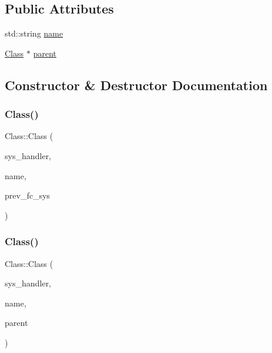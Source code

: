 \subsection*{Public Attributes}
\begin{DoxyCompactItemize}
\item 
std\+::string \hyperlink{classClass_aac209ee2e03afc3bc9e93fd1fd46256b}{name}
\item 
\hyperlink{classClass}{Class} $\ast$ \hyperlink{classClass_a1f94bc39c04d18b5c4421862f8506d1d}{parent}
\end{DoxyCompactItemize}


\subsection{Constructor \& Destructor Documentation}
\mbox{\label{classClass_a1c88be1af88c4c9b3c054d124ce44b6e}} 
\subsubsection{\texorpdfstring{Class()}{Class()}\hspace{0.1cm}{\footnotesize\ttfamily [1/2]}}
{\footnotesize\ttfamily Class\+::\+Class (\begin{DoxyParamCaption}\item[{\hyperlink{classSystemHandler}{System\+Handler} $\ast$}]{sys\+\_\+handler,  }\item[{std\+::string}]{name,  }\item[{\hyperlink{classFunctionSystem}{Function\+System} $\ast$}]{prev\+\_\+fc\+\_\+sys }\end{DoxyParamCaption})}

\mbox{\label{classClass_a1b960c202d43c46097e267e5c4e259ef}} 
\subsubsection{\texorpdfstring{Class()}{Class()}\hspace{0.1cm}{\footnotesize\ttfamily [2/2]}}
{\footnotesize\ttfamily Class\+::\+Class (\begin{DoxyParamCaption}\item[{\hyperlink{classSystemHandler}{System\+Handler} $\ast$}]{sys\+\_\+handler,  }\item[{std\+::string}]{name,  }\item[{\hyperlink{classClass}{Class} $\ast$}]{parent }\end{DoxyParamCaption})}

